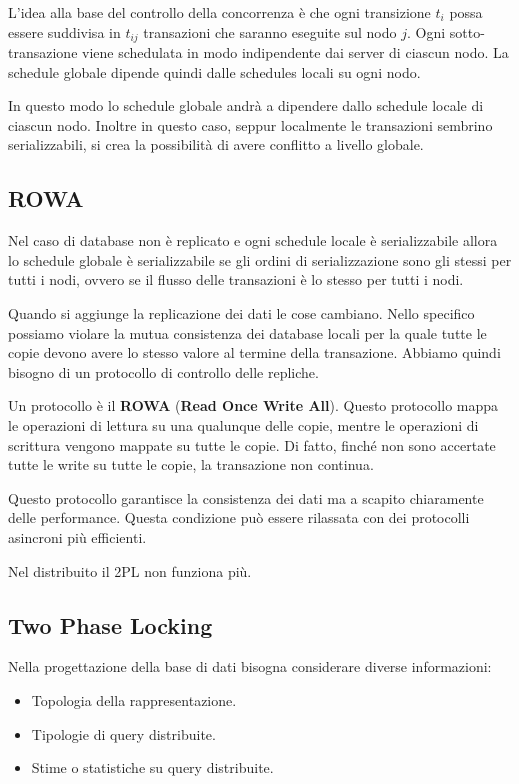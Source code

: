 L'idea alla base del controllo della concorrenza è che ogni transizione $t_i$
possa essere suddivisa in $t_{ij}$ transazioni che saranno eseguite sul nodo $j$.
Ogni sotto-transazione viene schedulata in modo indipendente dai server di
ciascun nodo. La schedule globale dipende quindi dalle schedules locali su ogni nodo.

In questo modo lo schedule globale andrà a dipendere dallo schedule locale di
ciascun nodo. Inoltre in questo caso, seppur localmente le transazioni sembrino
serializzabili, si crea la possibilità di avere conflitto a livello globale.
\subsection{ROWA}
Nel caso di database non è replicato e ogni schedule locale è serializzabile
allora lo schedule globale è serializzabile se gli ordini di serializzazione
sono gli stessi per tutti i nodi, ovvero se il flusso delle transazioni è lo
stesso per tutti i nodi.

Quando si aggiunge la replicazione dei dati le cose cambiano. Nello specifico
possiamo violare la mutua consistenza dei database locali per la quale tutte le
copie devono avere lo stesso valore al termine della transazione. Abbiamo quindi
bisogno di un protocollo di controllo delle repliche.

Un protocollo è il \textbf{ROWA} (\textbf{Read Once Write All}). Questo
protocollo mappa le operazioni di lettura su una qualunque delle copie, mentre
le operazioni di scrittura vengono mappate su tutte le copie. Di fatto, finché
non sono accertate tutte le write su tutte le copie, la transazione non continua.

Questo protocollo garantisce la consistenza dei dati ma a scapito chiaramente delle
performance. Questa condizione può essere rilassata con dei protocolli asincroni
più efficienti.

Nel distribuito il 2PL  non funziona più.

\subsection{Two Phase Locking}
Nella progettazione della base di dati bisogna considerare diverse informazioni:
\begin{itemize}
    \item Topologia della rappresentazione.
    \item Tipologie di query distribuite.
    \item Stime o statistiche su query distribuite.
\end{itemize}

